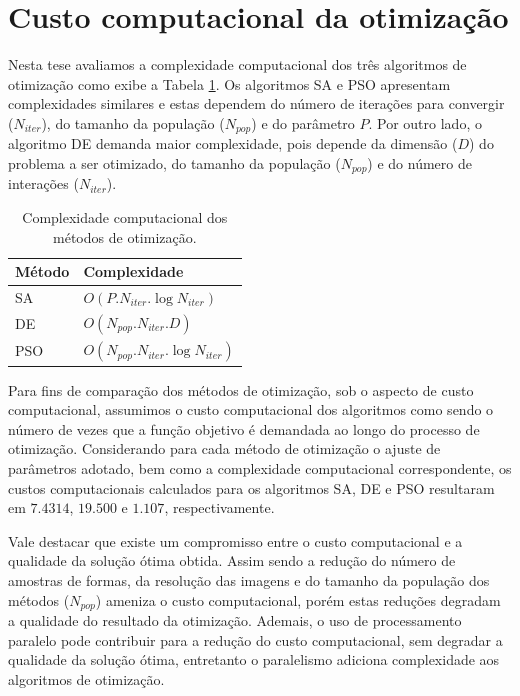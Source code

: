 \section{Custo computacional da otimização \label{sec:comp_cost}}


 Nesta tese avaliamos a complexidade computacional dos três algoritmos de otimização como exibe a Tabela \ref{tbl:complexity}.  Os algoritmos SA e PSO apresentam complexidades similares e estas dependem do número de iterações para convergir ($N_{iter}$), do tamanho da população  ($N_{pop}$) e do parâmetro $P$.  Por outro lado, o algoritmo DE demanda maior complexidade, pois depende da dimensão ($D$) do problema a ser otimizado, do tamanho da população ($N_{pop}$) e do número de interações ($N_{iter}$).

\begin{table}[h!]
\centering
\caption{Complexidade computacional dos métodos de otimização.}
\label{tbl:complexity}
  \begin{tabular}{ll}
  \toprule[1.5pt]
 Método & Complexidade\\
 \midrule
   SA  & $O(P.N_{iter}.\log{N_{iter}})$    \\
   DE  & $O(N_{pop}.N_{iter}.D)$   \\
   PSO&  $O(N_{pop}.N_{iter}.\log{N_{iter}})$\\
  \bottomrule[1.5pt]
  \end{tabular}
\end{table}

Para fins de comparação dos métodos de otimização, sob o aspecto de custo computacional, assumimos o custo computacional dos algoritmos como sendo o número de vezes que a função objetivo é demandada ao longo do processo de otimização. Considerando para cada método de otimização o ajuste de parâmetros adotado, bem como a complexidade computacional correspondente, os custos computacionais calculados para os algoritmos SA, DE e PSO resultaram em $7.4314$, $19.500$ e $1.107$, respectivamente. 

Vale destacar que existe um compromisso entre o custo computacional e a qualidade da solução ótima obtida. Assim sendo a redução do número de amostras de formas, da resolução das imagens e do tamanho da população dos métodos ($N_{pop}$) ameniza o custo computacional, porém estas reduções degradam a qualidade do resultado da otimização. Ademais, o uso de processamento paralelo pode contribuir para a redução do custo computacional, sem degradar a qualidade da solução ótima, entretanto o paralelismo adiciona complexidade aos algoritmos de otimização. 




